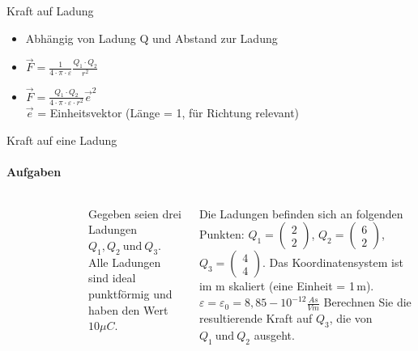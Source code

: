 \begin{frame}{Kraft auf Ladung}
  \begin{itemize}
    \item Abhängig von Ladung Q und Abstand zur Ladung
    \item $\vec{F} = \frac{1}{4 \cdot \pi \cdot \varepsilon}\frac{Q_1 \cdot Q_2}{r^2}$
    \item $\vec{F} = \frac{Q_1 \cdot Q_2}{4 \cdot \pi \cdot \varepsilon \cdot r^2}\vec{e}^2$ \\
$\vec{e}$ = Einheitsvektor (Länge = 1, für Richtung relevant)
  \end{itemize}
\end{frame}

\begin{frame}{Kraft auf eine Ladung}
\label{KraftAufLadungAufgabe1}
 \framesubtitle{Aufgaben}
\begin{columns}
 \begin{figure}
\end{figure}

 Gegeben seien drei Ladungen $Q_1, Q_2\ \text{und} \ Q_3$. Alle Ladungen sind ideal punktförmig und haben den Wert $10\mu C$.

  Die Ladungen befinden sich an folgenden Punkten: $Q_1= \left(\begin{array}{c} 2 \\
2 \end{array}\right)$,
  $Q_2= \left(\begin{array}{c} 6 \\ 2 \end{array}\right)$,
  $Q_3= \left(\begin{array}{c} 4 \\ 4 \end{array}\right)$. Das Koordinatensystem ist im m skaliert (eine Einheit = 1\,m). $\varepsilon = \varepsilon_0 = 8,85 -10^{-12}\frac{As}{Vm}$
  Berechnen Sie die resultierende Kraft auf $Q_3$, die von $Q_1 \ \text{und}\ Q_2$ ausgeht.
\end{columns}
\end{frame}

